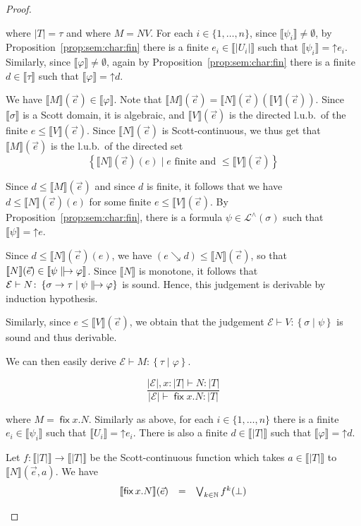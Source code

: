 \documentclass[%
  a4paper,
  UKenglish,
  cleveref,
  autoref,
  thm-restate,
  numberwithinsect,
]{lipics-v2021}
\newcommand\thesis{\vdash}
\newcommand\up{\mathord{\uparrow}}
\newcommand\NN{\mathbb{N}}
\newcommand\I[1]{\llbracket #1 \rrbracket} %
\newcommand\Env{\mathcal{E}}    %
\newcommand\term[1]{\mathsf{#1}}
\newcommand\fix{\mathop{\term{fix}}}
\newcommand\arrow\to
\newcommand\reft[1]{\left\{ #1 \right\}}
\newcommand\defrealto{\mathrel\parallel\joinrel\to}
\newcommand\realto{\mathrel{\defrealto}}
\newcommand\PT{\tau}		%
\newcommand\PTbis{\sigma}	%
\newcommand\RT{T}               %
\newcommand\RTbis{U}            %
\newcommand\UPT[1]{\vert #1 \vert}        %
\newcommand\step{\searrow}
\newcommand\Lang{\mathcal{L}}
\begin{document}
\begin{proof}
\begin{description}
\noindent
where $\UPT\RT = \PT$ and where $M = N V$.
%
For each $i \in \{1,\dots,n\}$,
since $\I{\psi_i} \neq \emptyset$,
by Proposition~\ref{prop:sem:char:fin}
there is a finite $e_i \in \I{\UPT{\RTbis_i}}$
such that $\I{\psi_i} = \up e_i$.
%
Similarly, since $\I\varphi \neq \emptyset$,
again by Proposition~\ref{prop:sem:char:fin}
there is a finite $d \in \I{\PT}$
such that $\I{\varphi} = \up d$.

We have
$\I M(\vec e) \in \I\varphi$.
Note that
$\I M(\vec e) = \I N(\vec e)\left(\I V(\vec e) \right)$.
%
Since $\I\PTbis$ is a Scott domain, it is algebraic,
and $\I V(\vec e)$ is the directed l.u.b.\ of the finite $e \leq \I V(\vec e)$.
Since $\I N(\vec e)$ is Scott-continuous, we thus get
that $\I M(\vec e)$ is the l.u.b.\ of the directed set
\[
\left\{
  \I N(\vec e)(e)
  \mid
  \text{$e$ finite and $\leq \I V(\vec e)$}
\right\}
\]

\noindent
Since $d \leq \I M(\vec e)$ and since $d$ is finite,
it follows that we have
$d \leq \I N(\vec e)(e)$ for some finite $e \leq \I V(\vec e)$.
By Proposition~\ref{prop:sem:char:fin},
there is a formula $\psi \in \Lang^\land(\PTbis)$
such that $\I\psi = \up e$.


Since $d \leq \I N(\vec e)(e)$, we have
$(e \step d) \leq \I N(\vec e)$,
so that
$\I N(\vec e) \in \I{\psi \realto \varphi}$.
Since $\I N$ is monotone, it follows that 
$\Env \thesis N \colon \reft{\PTbis \arrow \PT \mid \psi \realto \varphi}$
is sound.
Hence, this judgement is derivable by induction hypothesis.

Similarly, since $e \leq \I V(\vec e)$,
we obtain that the judgement
$\Env \thesis V \colon \reft{\PTbis \mid \psi}$
is sound and thus derivable.

We can then easily derive $\Env \thesis M \colon \reft{\PT \mid \varphi}$.

\item[Case of]
\[
\dfrac{\UPT\Env,x\colon\UPT\RT \thesis N \colon \UPT\RT}
  {\UPT\Env \thesis \fix x.N \colon \UPT\RT}
\]

\noindent
where $M = \fix x.N$.
%
Similarly as above, for each $i \in \{1,\dots,n\}$
there is a finite $e_i \in \I{\psi_i}$
such that $\I{\RTbis_i} = \up e_i$.
There is also
a finite $d \in \I{\UPT\RT}$ such that $\I\varphi = \up d$.

Let $f \colon \I{\UPT\RT} \to \I{\UPT\RT}$
be the Scott-continuous function which takes
$a \in \I{\UPT\RT}$ to $\I N(\vec e,a)$.
We have
\[
\begin{array}{l l l}
  \I{\fix x.N}(\vec e)
& =
& \bigvee_{k \in \NN}
  f^k(\bot)
\end{array}
\]


\end{description}
\end{proof}
\end{document}
